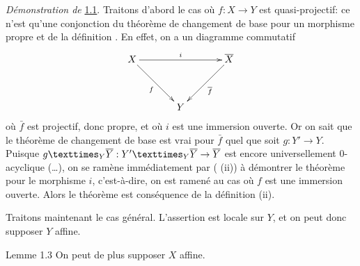 \documentclass[10pt]{../fichiers-configuration-latex/smfart}
\begin{document}
\noindent
\emph{Démonstration de} \hyperref[XVI.thm1.1]{1.1}. Traitons d'abord le cas où
$f:X\rightarrow Y$ est quasi-projectif: ce n'est qu'une conjonction du
théorème de changement de base pour un morphisme propre  et de
la définition . En effet, on a un diagramme commutatif
$$
\xymatrix@=1.25cm{
 X \ar[rr]^{i} \ar[rd]_{f}&        & \bar{X}\ar[ld]^{\bar{f}}\\
                         &   Y    &
}
$$
où $\bar{f}$ est projectif, donc propre, et où $i$ est une immersion
ouverte. Or on sait  que le théorème de changement de base est
vrai pour $\bar{f}$ quel que soit $g:Y'\rightarrow Y$. Puisque
$\fprod{g}{\bar{Y}}{Y}:\fprod{Y'}{\bar{Y}}{Y}\rightarrow \bar{Y}$ est
encore universellement $0$-acyclique (\resp\ldots), on se ramène
immédiatement par ( (ii)) à démontrer le théorème pour le
morphisme $i$, c'est-à-dire, on est ramené au cas où $f$ est une
immersion ouverte. Alors le théorème est conséquence de la définition
 (ii).

Traitons maintenant le cas général. L'assertion est locale sur $Y$, et
on peut donc supposer $Y$ affine.

\begin{enonce*}{Lemme 1.3}
On peut de plus supposer $X$ affine.
\end{enonce*}
\end{document}
